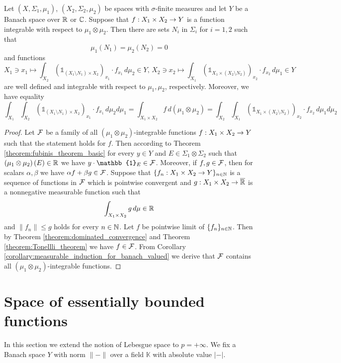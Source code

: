 \begin{theorem}[Fubini]\label{theorem:fubini}
Let $(X,\Sigma_1,\mu_1)$, $(X_2,\Sigma_2,\mu_2)$ be spaces with $\sigma$-finite measures and let $Y$ be a Banach space over ${\mathbb R}$ or ${\mathbb C}$. Suppose that $f:X_1\times X_2\rightarrow Y$ is a function integrable with respect to $\mu_1\otimes \mu_2$. Then there are sets $N_i$ in $\Sigma_i$ for $i=1,2$ such that
$$\mu_1(N_1) = \mu_2(N_2) = 0$$ 
and functions
$$X_1 \ni x_1\mapsto \int_{X_2}\left(\mathbb{1}_{\left(X_1\setminus N_1\right)\times X_2}\right)_{x_1}\cdot f_{x_1}\,d\mu_2\in Y,\,X_2 \ni x_2\mapsto \int_{X_1}\left(\mathbb{1}_{X_1\times \left(X_2\setminus N_2\right)}\right)_{x_2}\cdot f_{x_2}\,d\mu_1\in Y$$
are well defined and integrable with respect to $\mu_1, \mu_2$, respectively. Moreover, we have equality
$$\int_{X_1}\int_{X_2} \left(\mathbb{1}_{\left(X_1\setminus N_1\right)\times X_2}\right)_{x_1}\cdot f_{x_1}\,d\mu_2d\mu_1 = \int_{X_1\times X_2}f\,d(\mu_1\otimes \mu_2) = \int_{X_2}\int_{X_1} \left(\mathbb{1}_{X_1\times \left(X_2\setminus N_2\right)}\right)_{x_2}\cdot f_{x_2}\,d\mu_1d\mu_2$$
\end{theorem}
\begin{proof}
Let ${\mathcal F}$ be a family of all $\left(\mu_1\otimes \mu_2\right)$-integrable functions $f:X_1\times X_2\rightarrow Y$ such that the statement holds for $f$. Then according to Theorem \ref{theorem:fubinis_theorem_basic} for every $y\in Y$ and $E\in \Sigma_1\otimes \Sigma_2$ such that $\left(\mu_1\otimes \mu_2\right)(E) \in {\mathbb R}$ we have $y\cdot \mathbb{1}_E \in \cF$. Moreover, if $f, g\in {\mathcal F}$, then for scalars $\alpha,\beta$ we have $\alpha f + \beta g\in {\mathcal F}$. Suppose that $\{f_n:X_1\times X_2\rightarrow Y\}_{n\in {\mathbb N}}$ is a sequence of functions in ${\mathcal F}$ which is pointwise convergent and $g:X_1\times X_2\rightarrow \overline{{\mathbb R}}$ is a nonnegative measurable function such that
$$\int_{X_1\times X_2}g\,d\mu \in {\mathbb R}$$
and $\lVert f_n\rVert \leq g$ holds for every $n\in {\mathbb N}$. Let $f$ be pointwise limit of $\{f_n\}_{n\in {\mathbb N}}$. Then by Theorem \ref{theorem:dominated_convergence} and Theorem \ref{theorem:Tonellli_theorem} we have $f\in {\mathcal F}$. From Corollary \ref{corollary:measurable_induction_for_banach_valued} we derive that ${\mathcal F}$ contains all $\left(\mu_1\otimes \mu_2\right)$-integrable functions.
\end{proof}

\section{Space of essentially bounded functions}
\noindent
In this section we extend the notion of Lebesgue space to $p = +\infty$. We fix a Banach space $Y$ with norm $\lVert-\rVert$ over a field $\mathbb{K}$ with absolute value $|-|$.

